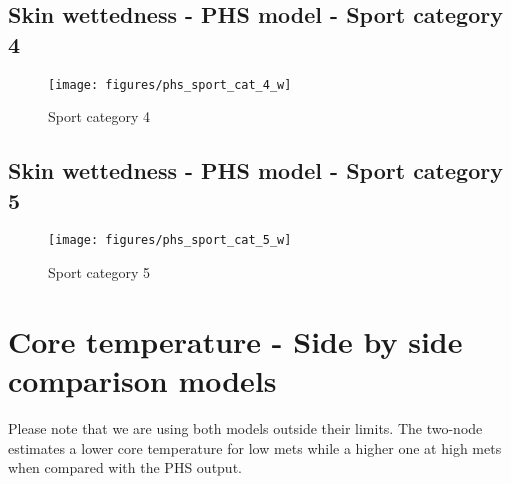 \documentclass[11pt]{article}
\begin{document}
    \clearpage

    \subsection{Skin wettedness - PHS model - Sport category 4}
    \begin{figure}[htb!]
        \centering
        \texttt{[image: figures/phs\_sport\_cat\_4\_w]}
        \caption{Sport category 4}\label{fig:phs_sport_cat_4_w}
    \end{figure}

    \clearpage

    \subsection{Skin wettedness - PHS model - Sport category 5}
    \begin{figure}[htb!]
        \centering
        \texttt{[image: figures/phs\_sport\_cat\_5\_w]}
        \caption{Sport category 5}\label{fig:phs_sport_cat_5_w}
    \end{figure}

    \clearpage

    \section{Core temperature - Side by side comparison models}\label{sec:side-by-side-comparison-models}
    Please note that we are using both models outside their limits.
    The two-node estimates a lower core temperature for low mets while a higher one at high mets when compared with the PHS output.
\end{document}
